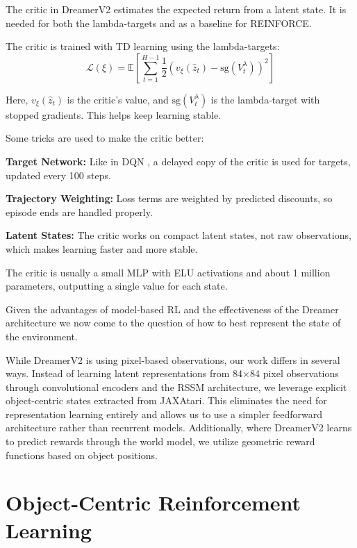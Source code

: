 \documentclass[
	english,
	ruledheaders=section,
	class=report,
	thesis={type=master},
	accentcolor=9c,
	custommargins=true,
	marginpar=false,
	parskip=half-,
	fontsize=11pt,
	pdfa=true,
]{tudapub}
\newcommand{\worldmodel}{world model}
\begin{document}
The critic in DreamerV2 estimates the expected return from a latent state. It
is needed for both the lambda-targets and as a baseline for REINFORCE.

The critic is trained with TD learning using the lambda-targets:
\begin{equation}
	\mathcal{L}(\xi) = \mathbb{E}\left[\sum_{t=1}^{H-1} \frac{1}{2} \left(v_\xi(\hat{z}_t) - \text{sg}(V^{\lambda}_t)\right)^2\right]
\end{equation}

Here, $v_\xi(\hat{z}_t)$ is the critic's value, and $\text{sg}(V^{\lambda}_t)$
is the lambda-target with stopped gradients. This helps keep learning stable.

Some tricks are used to make the critic better:

\textbf{Target Network:} Like in DQN \cite{DQN}, a delayed copy of the critic is used for targets, updated every 100 steps.

\textbf{Trajectory Weighting:} Loss terms are weighted by predicted discounts, so episode ends are handled properly.

\textbf{Latent States:} The critic works on compact latent states, not raw observations, which makes learning faster and more stable.

The critic is usually a small MLP with ELU activations and about 1 million
parameters, outputting a single value for each state.

Given the advantages of model-based RL and the effectiveness of the Dreamer
architecture we now come to the question of how to best represent the state of
the environment.

While DreamerV2 is using pixel-based observations,
our work differs in several ways. Instead of learning latent
representations from 84×84 pixel observations through convolutional encoders
and the RSSM architecture, we leverage explicit object-centric states extracted
from JAXAtari. This eliminates the need for representation learning entirely
and allows us to use a simpler feedforward architecture rather than recurrent
models. Additionally, where DreamerV2 learns to predict rewards through the
\worldmodel{}, we utilize geometric reward functions based on object positions.

\section{Object-Centric Reinforcement Learning}
\label{sec:object_centric_rl}
\end{document}
